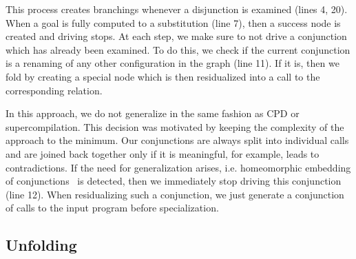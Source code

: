 This process creates branchings whenever a disjunction is examined (lines 4, 20).
When a goal is fully computed to a substitution (line 7), then a success node is created and driving stops.
At each step, we make sure to not drive a conjunction which has already been examined.
To do this, we check if the current conjunction is a renaming of any other configuration in the graph (line 11).
If it is, then we fold by creating a special node which is then residualized into a call to the corresponding relation.

In this approach, we do not generalize in the same fashion as CPD or supercompilation.
This decision was motivated by keeping the complexity of the approach to the minimum.
Our conjunctions are always split into individual calls and are joined back together only if it is meaningful, for example, leads to contradictions.
If the need for generalization arises, i.e. homeomorphic embedding of conjunctions~\cite{de1999conjunctive} is detected, then we immediately stop driving this conjunction (line 12).
When residualizing such a conjunction, we just generate a conjunction of calls to the input program before specialization.





\subsection{Unfolding}

